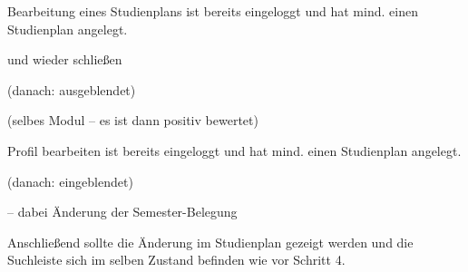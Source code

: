 \begin{scenario*}{Bearbeitung eines Studienplans}
	{ ist bereits eingeloggt und hat mind. einen \gls{Studienplan} angelegt.}
	\item {}
	\item {} 
	\item {} und wieder schließen
	\item {}
	\item {}
	\item {} (danach: ausgeblendet)
	\item {}
	\item {}
	\item {} (selbes \gls{Modul} – es ist dann positiv bewertet) 
	\item {}
	\item {}
	\item {}
\end{scenario*}

\begin{scenario*}{Profil bearbeiten}
	{ ist bereits eingeloggt und hat mind. einen \gls{Studienplan} angelegt.}
	\item {}
	\item {} (danach: eingeblendet)
	\item {}
	\item {} – dabei Änderung der Semester-Belegung
	\item Anschließend sollte die Änderung im Studienplan gezeigt werden und die Suchleiste sich im selben Zustand befinden wie vor Schritt 4.
\end{scenario*}


